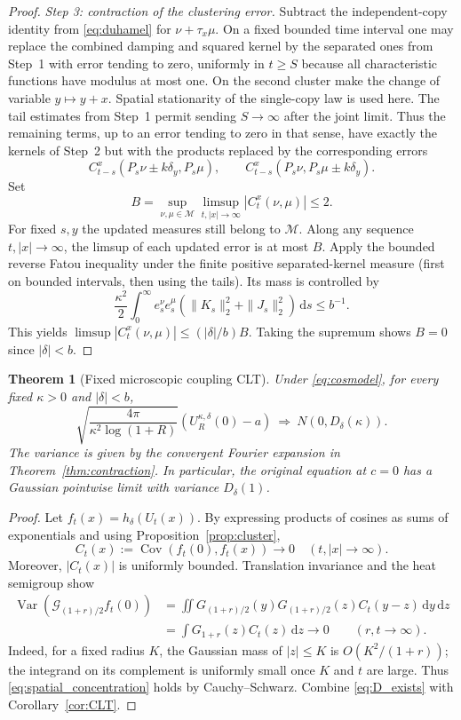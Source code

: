 \documentclass[11pt]{article}
\numberwithin{equation}{section}
\newtheorem{theorem}{Theorem}[section]
\theoremstyle{definition}
\theoremstyle{remark}
\newcommand{\clG}{\mathcal G}
\newcommand{\dd}{\,\mathrm d}
\newcommand{\Var}{\operatorname{Var}}
\newcommand{\Cov}{\operatorname{Cov}}
\begin{document}
\begin{proof}
\emph{Step 3: contraction of the clustering error.} Subtract the independent-copy identity from \eqref{eq:duhamel} for $\nu+\tau_x\mu$. On a fixed bounded time interval one may replace the combined damping and squared kernel by the separated ones from Step~1 with error tending to zero, uniformly in $t\ge S$ because all characteristic functions have modulus at most one. On the second cluster make the change of variable $y\mapsto y+x$. Spatial stationarity of the single-copy law is used here. The tail estimates from Step~1 permit sending $S\to\infty$ after the joint limit. Thus the remaining terms, up to an error tending to zero in that sense, have exactly the kernels of Step~2 but with the products replaced by the corresponding errors
\[
 C_{t-s}^x(P_s\nu\pm k\delta_y,P_s\mu),\qquad
 C_{t-s}^x(P_s\nu,P_s\mu\pm k\delta_y).
\]
Set
\[
 B=\sup_{\nu,\mu\in\mathcal M}\limsup_{t,|x|\to\infty}|C_t^x(\nu,\mu)|\le2.
\]
For fixed $s,y$ the updated measures still belong to $\mathcal M$. Along any sequence $t,|x|\to\infty$, the limsup of each updated error is at most $B$. Apply the bounded reverse Fatou inequality under the finite positive separated-kernel measure (first on bounded intervals, then using the tails). Its mass is controlled by
\[
 \frac{\kappa^2}{2}\int_0^\infty e_s^\nu e_s^\mu
 (\|K_s\|_2^2+\|J_s\|_2^2)\dd s\le b^{-1}.
\]
This yields $\limsup|C_t^x(\nu,\mu)|\le (|\delta|/b)B$. Taking the supremum shows $B=0$ since $|\delta|<b$.
\end{proof}
\begin{theorem}[Fixed microscopic coupling CLT]\label{thm:fixedCLT}
Under \eqref{eq:cosmodel}, for every fixed $\kappa>0$ and $|\delta|<b$,
\begin{equation}\label{eq:fixedCLT}
 \sqrt{\frac{4\pi}{\kappa^2\log(1+R)}}(U_R^{\kappa,\delta}(0)-a)
 \ \Rightarrow\ N(0,D_\delta(\kappa)).
\end{equation}
The variance is given by the convergent Fourier expansion in Theorem~\ref{thm:contraction}. In particular, the original equation at $c=0$ has a Gaussian pointwise limit with variance $D_\delta(1)$.
\end{theorem}
\begin{proof}
Let $f_t(x)=h_\delta(U_t(x))$. By expressing products of cosines as sums of exponentials and using Proposition~\ref{prop:cluster},
\[
 C_t(x):=\Cov(f_t(0),f_t(x))\to0\quad(t,|x|\to\infty).
\]
Moreover, $|C_t(x)|$ is uniformly bounded. Translation invariance and the heat semigroup show
\begin{align*}
 \Var(\clG_{(1+r)/2}f_t(0))
 &=\iint G_{(1+r)/2}(y)G_{(1+r)/2}(z)C_t(y-z)\dd y\dd z\\
 &=\int G_{1+r}(z)C_t(z)\dd z\longrightarrow0\qquad(r,t\to\infty).
\end{align*}
Indeed, for a fixed radius $K$, the Gaussian mass of $|z|\le K$ is $O(K^2/(1+r))$; the integrand on its complement is uniformly small once $K$ and $t$ are large. Thus \eqref{eq:spatial_concentration} holds by Cauchy--Schwarz. Combine \eqref{eq:D_exists} with Corollary~\ref{cor:CLT}.
\end{proof}
\end{document}
